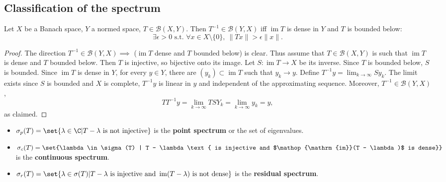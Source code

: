 \documentclass{article}
\DeclareMathOperator{\im}{im}
\begin{document}
\subsection{Classification of the spectrum}
\begin{prop}
    Let $X$ be a Banach space, $Y$ a normed space, $T \in \mathcal{B}(X,Y)$.
    Then $T^{-1} \in \mathcal{B}(Y,X)$ iff $\im T$ is dense in $Y$ and $T$ is bounded below:
    \begin{equation*}
        \exists \epsilon > 0 \text{ s.t. } \forall x \in X \setminus \{0\}, \ \|T x\| > \epsilon \|x\|.
    \end{equation*}
\end{prop}

\begin{proof}
    The direction $T^{-1} \in \mathcal{B}(Y, X) \implies$ ($\im T$ dense and $T$ bounded below) is clear.
    Thus assume that $T \in \mathcal{B}(X, Y)$ is such that $\im T$ is dense and $T$ bounded below.
    Then $T$ is injective, so bijective onto its image.
    Let $S: \im T \to X$ be its inverse.
    Since $T$ is bounded below, $S$ is bounded.
    Since $\im T$ is dense in $Y$, for every $y \in Y$, there are $(y_k) \subset \im T$ such that $y_k \to y$.
    Define $T^{-1} y = \lim_{k \to \infty} Sy_k$.
    The limit exists since $S$ is bounded and $X$ is complete, $T^{-1} y$ is linear in $y$ and independent of the approximating sequence.
    Moreover, $T^{-1} \in \mathcal{B}(Y, X)$,
    \begin{equation*}
        T T^{-1} y = \lim_{k \to \infty} T S Y_k = \lim_{k \to \infty} y_k = y,
    \end{equation*}
    as claimed.
\end{proof}

\begin{defi}
    \begin{itemize}
        \item $\sigma_p(T) = \set{\lambda \in \C | T - \lambda \text{ is not injective}}$ is the \textbf{point spectrum} or the set of eigenvalues.
        \item $\sigma_c(T) = \set{\lambda \in \sigma(T) | T - \lambda \text{ is injective and $\im (T - \lambda)$ is dense}}$ is the \textbf{continuous spectrum}.
        \item $\sigma_r(T) = \set{\lambda \in \sigma(T) | T - \lambda \text{ is injective and } \im(T - \lambda) \text{ is not dense}}$ is the \textbf{residual spectrum}.
    \end{itemize}
\end{defi}
\end{document}
